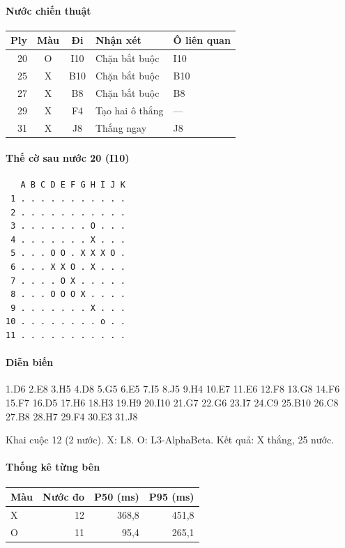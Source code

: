 \paragraph{Nước chiến thuật}
\begin{center}\small
\begin{tabular}{@{}rccll@{}}
\toprule
Ply & Màu & Đi & Nhận xét & Ô liên quan \\
\midrule
20 & O & I10 & Chặn bắt buộc & I10 \\
25 & X & B10 & Chặn bắt buộc & B10 \\
27 & X & B8 & Chặn bắt buộc & B8 \\
29 & X & F4 & Tạo hai ô thắng & — \\
31 & X & J8 & Thắng ngay & J8 \\
\bottomrule
\end{tabular}
\end{center}
\paragraph{Thế cờ sau nước 20 (I10)}
\begin{verbatim}
   A B C D E F G H I J K
 1 . . . . . . . . . . .
 2 . . . . . . . . . . .
 3 . . . . . . . O . . .
 4 . . . . . . . X . . .
 5 . . . O O . X X X O .
 6 . . . X X O . X . . .
 7 . . . . O X . . . . .
 8 . . . O O O X . . . .
 9 . . . . . . . X . . .
10 . . . . . . . . o . .
11 . . . . . . . . . . .
\end{verbatim}
\paragraph{Diễn biến}
{\footnotesize 1.D6 2.E8 3.H5 4.D8 5.G5 6.E5 7.I5 8.J5 9.H4 10.E7 11.E6 12.F8 13.G8 14.F6 15.F7 16.D5 17.H6 18.H3 19.H9 20.I10 21.G7 22.G6 23.I7 24.C9 25.B10 26.C8 27.B8 28.H7 29.F4 30.E3 31.J8\par}
Khai cuộc 12 (2 nước). X: L8. O: L3-AlphaBeta. Kết quả: X thắng, 25 nước.
\paragraph{Thống kê từng bên}
\begin{center}\small
\begin{tabular}{@{}lrrr@{}}
\toprule
Màu & Nước đo & P50 (ms) & P95 (ms) \\
\midrule
X & 12 & 368,8 & 451,8 \\
O & 11 & 95,4 & 265,1 \\
\bottomrule
\end{tabular}
\end{center}
